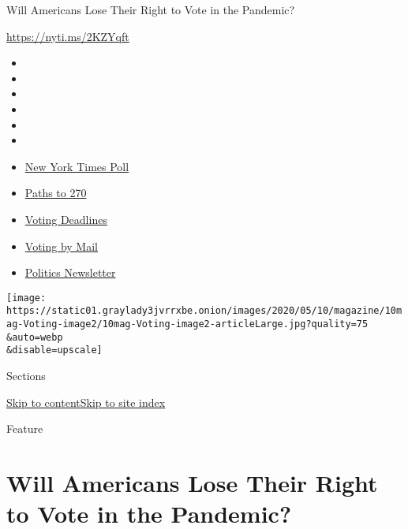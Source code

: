 Will Americans Lose Their Right to Vote in the Pandemic?

\url{https://nyti.ms/2KZYqft}

\begin{itemize}
\item
\item
\item
\item
\item
\item
\end{itemize}

\begin{itemize}
\item
  \href{https://www.nytimes3xbfgragh.onion/2020/09/12/us/politics/biden-trump-poll-wisconsin-minnesota.html?action=click\&pgtype=Article\&state=default\&region=TOP_BANNER\&context=storylines_menu}{New
  York Times Poll}
\item
  \href{https://www.nytimes3xbfgragh.onion/interactive/2020/us/elections/election-states-biden-trump.html?action=click\&pgtype=Article\&state=default\&region=TOP_BANNER\&context=storylines_menu}{Paths
  to 270}
\item
  \href{https://www.nytimes3xbfgragh.onion/interactive/2019/us/elections/2020-presidential-election-calendar.html?action=click\&pgtype=Article\&state=default\&region=TOP_BANNER\&context=storylines_menu}{Voting
  Deadlines}
\item
  \href{https://www.nytimes3xbfgragh.onion/interactive/2020/08/31/us/politics/vote-by-mail-deadlines.html?action=click\&pgtype=Article\&state=default\&region=TOP_BANNER\&context=storylines_menu}{Voting
  by Mail}
\item
  \href{https://www.nytimes3xbfgragh.onion/newsletters/politics?action=click\&pgtype=Article\&state=default\&region=TOP_BANNER\&context=storylines_menu}{Politics
  Newsletter}
\end{itemize}

\texttt{[image: https://static01.graylady3jvrrxbe.onion/images/2020/05/10/magazine/10mag-Voting-image2/10mag-Voting-image2-articleLarge.jpg?quality=75\\\&auto=webp\\\&disable=upscale]}

Sections

\protect\hyperlink{site-content}{Skip to
content}\protect\hyperlink{site-index}{Skip to site index}

Feature

\hypertarget{will-americans-lose-their-right-to-vote-in-the-pandemic}{%
\section{Will Americans Lose Their Right to Vote in the
Pandemic?}\label{will-americans-lose-their-right-to-vote-in-the-pandemic}}

